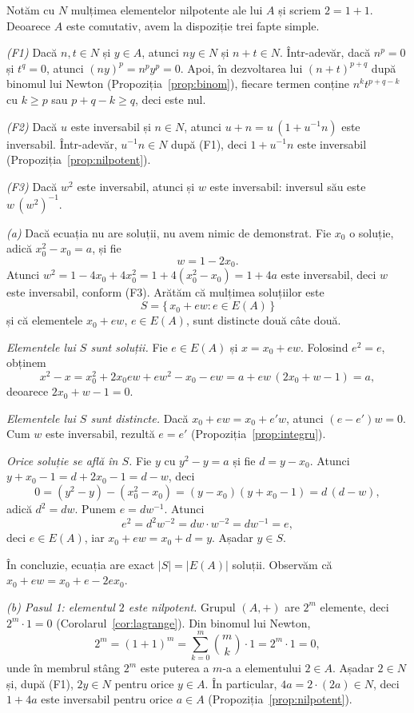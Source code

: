 \begin{solutie}
Notăm cu $N$ mulțimea elementelor nilpotente ale lui $A$ și scriem $2=1+1$.
Deoarece $A$ este comutativ, avem la dispoziție trei fapte simple.

\emph{(F1)} Dacă $n,t\in N$ și $y\in A$, atunci $ny\in N$ și $n+t\in N$.
Într-adevăr, dacă $n^{p}=0$ și $t^{q}=0$, atunci $(ny)^{p}=n^{p}y^{p}=0$. Apoi,
în dezvoltarea lui $(n+t)^{p+q}$ după binomul lui Newton
(Propoziția~\ref{prop:binom}), fiecare termen conține $n^{k}t^{p+q-k}$ cu
$k\ge p$ sau $p+q-k\ge q$, deci este nul.

\emph{(F2)} Dacă $u$ este inversabil și $n\in N$, atunci $u+n=u\,(1+u^{-1}n)$
este inversabil. Într-adevăr, $u^{-1}n\in N$ după (F1), deci $1+u^{-1}n$ este
inversabil (Propoziția~\ref{prop:nilpotent}).

\emph{(F3)} Dacă $w^{2}$ este inversabil, atunci și $w$ este inversabil:
inversul său este $w\,(w^{2})^{-1}$.

\smallskip
\textit{(a)} Dacă ecuația nu are soluții, nu avem nimic de demonstrat. Fie
$x_{0}$ o soluție, adică $x_{0}^{2}-x_{0}=a$, și fie
\[
  w=1-2x_{0}.
\]
Atunci $w^{2}=1-4x_{0}+4x_{0}^{2}=1+4(x_{0}^{2}-x_{0})=1+4a$ este inversabil,
deci $w$ este inversabil, conform (F3). Arătăm că mulțimea soluțiilor este
\[
  S=\{\,x_{0}+ew : e\in E(A)\,\}
\]
și că elementele $x_{0}+ew$, $e\in E(A)$, sunt distincte două câte două.

\emph{Elementele lui $S$ sunt soluții.} Fie $e\in E(A)$ și $x=x_{0}+ew$.
Folosind $e^{2}=e$, obținem
\[
  x^{2}-x=x_{0}^{2}+2x_{0}ew+ew^{2}-x_{0}-ew=a+ew\,(2x_{0}+w-1)=a,
\]
deoarece $2x_{0}+w-1=0$.

\emph{Elementele lui $S$ sunt distincte.} Dacă $x_{0}+ew=x_{0}+e'w$, atunci
$(e-e')w=0$. Cum $w$ este inversabil, rezultă $e=e'$
(Propoziția~\ref{prop:integru}).

\emph{Orice soluție se află în $S$.} Fie $y$ cu $y^{2}-y=a$ și fie
$d=y-x_{0}$. Atunci $y+x_{0}-1=d+2x_{0}-1=d-w$, deci
\[
  0=(y^{2}-y)-(x_{0}^{2}-x_{0})=(y-x_{0})(y+x_{0}-1)=d\,(d-w),
\]
adică $d^{2}=dw$. Punem $e=dw^{-1}$. Atunci
\[
  e^{2}=d^{2}w^{-2}=dw\cdot w^{-2}=dw^{-1}=e,
\]
deci $e\in E(A)$, iar $x_{0}+ew=x_{0}+d=y$. Așadar $y\in S$.

În concluzie, ecuația are exact $|S|=|E(A)|$ soluții. Observăm că
$x_{0}+ew=x_{0}+e-2ex_{0}$.

\smallskip
\textit{(b) Pasul 1: elementul $2$ este nilpotent.} Grupul $(A,+)$ are $2^{m}$
elemente, deci $2^{m}\cdot1=0$ (Corolarul~\ref{cor:lagrange}). Din binomul lui
Newton,
\[
  2^{m}=(1+1)^{m}=\sum_{k=0}^{m}\binom{m}{k}\cdot1=2^{m}\cdot1=0,
\]
unde în membrul stâng $2^{m}$ este puterea a $m$-a a elementului $2\in A$.
Așadar $2\in N$ și, după (F1), $2y\in N$ pentru orice $y\in A$. În particular,
$4a=2\cdot(2a)\in N$, deci $1+4a$ este inversabil pentru orice $a\in A$
(Propoziția~\ref{prop:nilpotent}).


\end{solutie}
